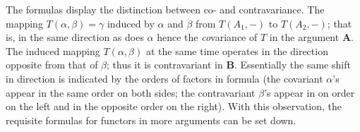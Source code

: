 \documentclass[11pt,a4paper]{report}
\begin{document}
The formulas  display the distinction between co- and contravariance.
The mapping $T(\alpha,\beta)=\gamma$ induced by $\alpha$ and $\beta$ from $T(A_1,-)$ to $T(A_2,-)$; that is, in the same
direction as does $\alpha$ hence the \emph{co}variance of $T$ in the argument $\mathbf{A}$. The induced mapping
$T(\alpha,\beta)$ at the same time operates in the direction opposite from that of $\beta$; thus it is contravariant
in $\mathbf{B}$. Essentially the same shift in direction is indicated by the orders of factors in formula 
(the covariant $\alpha$'s appear in the same order on both sides; the contravariant $\beta$'s appear in on order
on the left and in the opposite order on the right). With this observation, the requisite formulas for functors in more
arguments can be set down.
\end{document}
